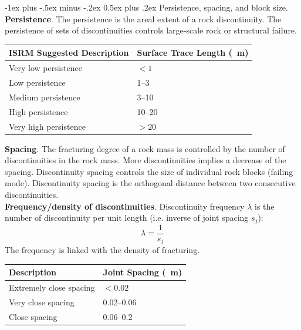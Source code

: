\documentclass[10pt,landscape,a4paper]{article}
\makeatletter
\renewcommand{\section}{\@startsection{section}{1}{0mm}%
	{-1ex plus -.5ex minus -.2ex}%
	{0.5ex plus .2ex}%
	{\normalfont\large\bfseries}}
\makeatother
\begin{document}
\begin{multicols}{3}
	\section{Persistence, spacing, and block size.}
	\textbf{Persistence}.
	The persistence is the areal extent of a rock discontinuity.
	The persistence of sets of discontinuities controls large-scale rock or structural failure.
	\begin{table}[H]\scriptsize\centering\begin{tabular}{ll}
			ISRM Suggested Description & Surface Trace Length (\SI{}{\meter}) \\
			\hline
			Very low persistence       & $<1$                                 \\
			Low persistence            & \SIrange{1}{3}{}                     \\
			Medium persistence         & \SIrange{3}{10}{}                    \\
			High persistence           & \SIrange{10}{20}{}                   \\
			Very high persistence      & $>20$                                \\
		\end{tabular}\end{table}
	\textbf{Spacing}.
	The fracturing degree of a rock mass is controlled by the number of discontinuities in the rock mass.
	More discontinuities implies a decrease of the spacing.
	Discontinuity spacing controls the size of individual rock blocks (failing mode).
	Discontinuity spacing is the orthogonal distance between two consecutive discontinuities.\\
	\textbf{Frequency/density of discontinuities}.
	Discontinuity frequency $\lambda$ is the number of discontinuity per unit length (i.e. inverse of joint spacing $s_j$):
	\[
		\lambda=\frac{1}{s_j}
	\]
	The frequency is linked with the density of fracturing.
	\begin{table}[H]\scriptsize\centering\begin{tabular}{ll}
			Description             & Joint Spacing (\SI{}{\meter}) \\
			\hline
			Extremely close spacing & $<0.02$                       \\
			Very close spacing      & \SIrange{0.02}{0.06}{}        \\
			Close spacing           & \SIrange{0.06}{0.2}{}         \\

\end{tabular}
\end{table}
\end{multicols}
\end{document}
